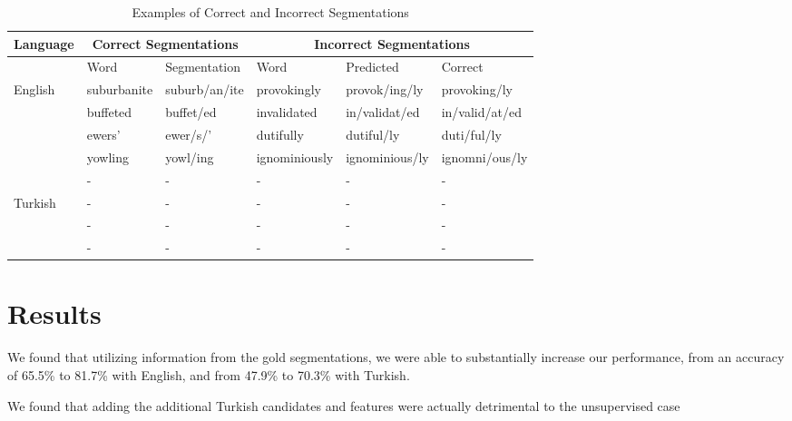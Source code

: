 \documentclass[11pt,twocolumn]{article}
\begin{document}
\begin{table*}
    \begin{center}
        \begin{tabular}{ | l | l | l | l | l | l |}
            \hline
            Language & \multicolumn{2}{|c|}{\textbf{Correct Segmentations}} & \multicolumn{3}{|c|}{\textbf{Incorrect Segmentations}}\\ \hline
                     & Word & Segmentation & Word & Predicted & Correct\\ \hline
            English & suburbanite & suburb/an/ite & provokingly & provok/ing/ly & provoking/ly  \\ 
                    & buffeted & buffet/ed & invalidated  & in/validat/ed & in/valid/at/ed \\ 
                    & ewers' &  ewer/s/' & dutifully & dutiful/ly & duti/ful/ly\\ 
                    & yowling & yowl/ing & ignominiously & ignominious/ly& ignomni/ous/ly \\ 
            \hline
                    & - & - & - & - & -\\ 
            Turkish & - & - & - & - & -\\ 
                    & - & - & - & - & -\\ 
                    & - & - & - & - & -\\ \hline
        \end{tabular}
        \caption{Examples of Correct and Incorrect Segmentations}
    \end{center}
\end{table*}

\section{Results}
We found that utilizing information from the gold segmentations, we were able to substantially increase our
performance, from an accuracy of 65.5\% to 81.7\% with English, and from 47.9\% to 70.3\% with Turkish.

We found that adding the additional Turkish candidates and features were actually detrimental to the 
unsupervised case 



\end{document}
